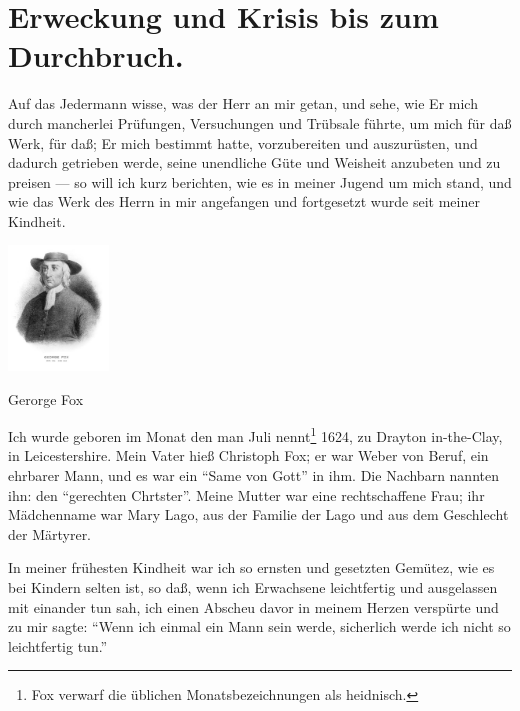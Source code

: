 \chapter[Erweckung und Krisis]{Erweckung und Krisis bis zum Durchbruch.}




Auf das Jedermann wisse, was der Herr an mir getan, und
sehe, wie Er mich durch mancherlei Prüfungen, Versuchungen und
Trübsale führte, um mich für daß Werk, für daß; Er mich bestimmt 
hatte, vorzubereiten und auszurüsten, und dadurch getrieben 
werde, seine unendliche Güte und Weisheit anzubeten und
zu preisen — so will ich kurz berichten, wie es in meiner Jugend
um mich stand, und wie das Werk des Herrn in mir angefangen
und fortgesetzt wurde seit meiner Kindheit.

\begin{floatingfigure}[3]{4cm}
\includegraphics[width=0.20\textwidth]{./pics/Fox-George-LOC.png}
\caption[]{Gerorge Fox}
\end{floatingfigure}




Ich wurde geboren im Monat den man Juli nennt\footnote{Fox 
verwarf die üblichen Monatsbezeichnungen als heidnisch.} 1624,
zu Drayton in-the-Clay, in Leicestershire. Mein Vater hieß
Christoph Fox; er war Weber von Beruf, ein ehrbarer Mann,
und es war ein "`Same von Gott"' in ihm. Die Nachbarn
nannten ihn: den "`gerechten Chrtster"'. Meine Mutter war eine
rechtschaffene Frau; ihr Mädchenname war Mary Lago, aus der
Familie der Lago und aus dem Geschlecht der Märtyrer.

In meiner frühesten Kindheit war ich so ernsten und gesetzten
Gemütez, wie es bei Kindern selten ist, so daß, wenn ich Erwachsene 
leichtfertig und ausgelassen mit einander tun sah, ich
einen Abscheu davor in meinem Herzen verspürte und zu mir
sagte: "`Wenn ich einmal ein Mann sein werde, sicherlich werde
ich nicht so leichtfertig tun."'

